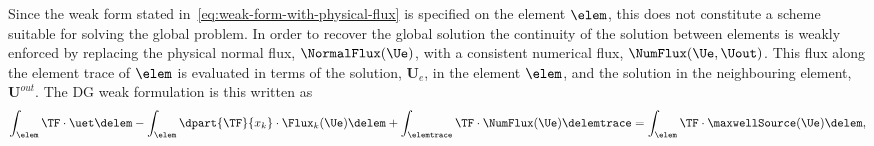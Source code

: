 Since the weak form stated in~\eqref{eq:weak-form-with-physical-flux} is specified on the element $\elem$, this does not constitute a scheme suitable for solving the global problem. In order to recover the global solution the continuity of the solution between elements is weakly enforced by replacing the physical normal flux, $\NormalFlux(\Ue)$, with a consistent numerical flux, $\NumFlux(\Ue,\Uout)$. This flux along the element trace of $\elem$ is evaluated in terms of the solution, $\mathbf{U}_e$, in the element $\elem$, and the solution in the neighbouring element, $\mathbf{U}^{out}$. The DG weak formulation is this written as
\begin{equation}
\int_{\elem} \TF \cdot \uet \delem  - \int_{\elem} \dpart{\TF}{x_k} \cdot
\Flux_{k}(\Ue) \delem + \int_{\elemtrace} \TF \cdot \NumFlux(\Ue) \delemtrace
= \int_{\elem} \TF \cdot \maxwellSource(\Ue) \delem,
\label{eq:weak-form-with-numerical-flux}
\end{equation}


